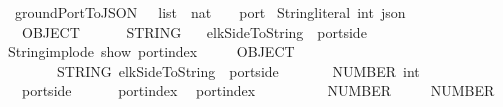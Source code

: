 \ groundPortToJSON\ {\isacharcolon}{\isacharcolon}\ {\isachardoublequoteopen}\ list\ {\isasymRightarrow}\ nat\ {\isasymRightarrow}\ {\isacharparenleft}\ \ port\isanewline
{}\ {\isacharparenleft}String{\isachardot}literal{\isacharcomma}\ int{\isacharparenright}\ json{\isachardoublequoteclose}\isanewline
\ \ \ {\isachardoublequoteopen}\ \ {\isacharequal}\isanewline
\ \ OBJECT\ {\isacharbrackleft}\isanewline
\ \ \ \ {\isacharparenleft}\ STRING\ {\isacharparenleft}\ \ {\isacharplus}\isanewline
{}elkSideToString\ {\isacharparenleft}\ {\isacharparenleft}port{\isachardot}side\ \ {\isacharplus}\isanewline
{}String{\isachardot}implode\ {\isacharparenleft}show\ {\isacharparenleft}port{\isachardot}index\ \isanewline
\ \ {\isacharcomma}\ {\isacharparenleft}\ OBJECT\ {\isacharbrackleft}\isanewline
\ \ \ \ \ \ {\isacharparenleft}\ STRING\ {\isacharparenleft}elkSideToString\ {\isacharparenleft}\ {\isacharparenleft}port{\isachardot}side\ \isanewline
\ \ \ \ {\isacharcomma}\ {\isacharparenleft}\ NUMBER\ {\isacharparenleft}int\ {\isacharparenleft}\isanewline
{}\ \ {\isacharparenleft}port{\isachardot}side\ \ {\isasymin}\ \isanewline
{}\ \ {\isacharminus}\ port{\isachardot}index\ \isanewline
{}\ port{\isachardot}index\ \isanewline
\ \ \ \ {\isacharbrackright}{\isacharparenright}\isanewline
\ \ {\isacharcomma}\ {\isacharparenleft}\ NUMBER\ {}{}{\isacharparenright}\isanewline
\ \ {\isacharcomma}\ {\isacharparenleft}\ NUMBER\ {}{}{\isacharparenright}{\isacharbrackright}{\isachardoublequoteclose}
